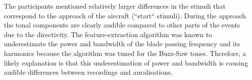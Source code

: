 The participants mentioned relatively larger differences in the stimuli that
correspond to the approach of the aircraft (``start`` stimuli). During the
approach the tonal components are clearly audible compared to other parts of the
events due to the directivity. The feature-extraction algorithm was known to
underestimate the power and bandwidth of the blade passing frequency and its
harmonics because the algorithm was tuned for the Buzz-Saw tones. Therefore, a
likely explanation is that this underestimation of power and bandwidth is
causing audible differences between recordings and auralisations.

